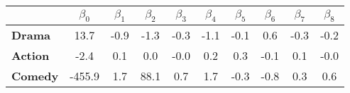 \begin{tabular}{|l|c|c|c|c|c|c|c|c|c|}
\hline
&\textbf{$\beta_{0}$}&\textbf{$\beta_{1}$}&\textbf{$\beta_{2}$}&\textbf{$\beta_{3}$}&\textbf{$\beta_{4}$}&\textbf{$\beta_{5}$}&\textbf{$\beta_{6}$}&\textbf{$\beta_{7}$}&\textbf{$\beta_{8}$}\\\hline
\textbf{Drama}&13.7&-0.9&-1.3&-0.3&-1.1&-0.1&0.6&-0.3&-0.2\\\hline
\textbf{Action}&-2.4&0.1&0.0&-0.0&0.2&0.3&-0.1&0.1&-0.0\\\hline
\textbf{Comedy}&-455.9&1.7&88.1&0.7&1.7&-0.3&-0.8&0.3&0.6\\\hline
\end{tabular}
